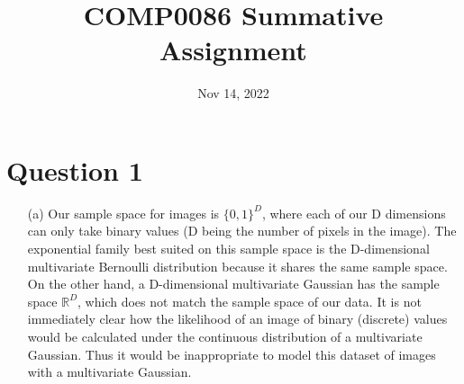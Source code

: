 \documentclass[12pt]{article}
\title{\textbf{COMP0086 Summative Assignment}}
\date{Nov 14, 2022}
\begin{document}
\maketitle
\section*{Question 1}


\begin{enumerate}

\item[(a)] Our sample space for images is $\{0, 1\}^D$, where each of our D dimensions can only take binary values (D being the number of pixels in the image).
The exponential family best suited on this sample space is the D-dimensional multivariate Bernoulli distribution because it shares the same sample space.
On the other hand, a D-dimensional multivariate Gaussian has the sample space $\mathbb{R}^D$, which does not match the sample space of our data.
It is not immediately clear how the likelihood of an image of binary (discrete) values would be calculated under the continuous distribution of a multivariate Gaussian.
Thus it would be inappropriate to model this dataset of images with a multivariate Gaussian.


\end{enumerate}
\end{document}
